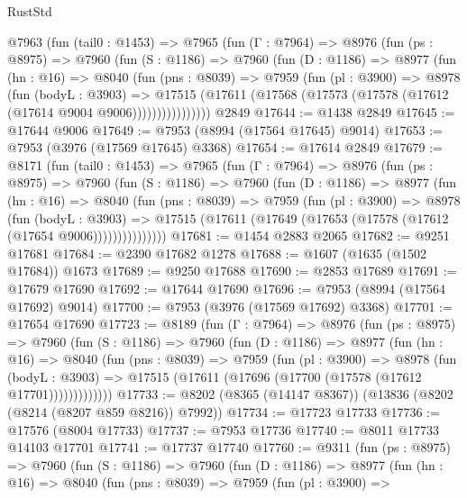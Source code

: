 \begin{lexlean}{RustStd}
\begin{coremodule}
    @7963
      (fun (tail0 : @1453) =>
      @7965
        (fun (Γ : @7964) =>
        @8976
          (fun (ps : @8975) =>
          @7960
            (fun (S : @1186) =>
            @7960
              (fun (D : @1186) =>
              @8977
                (fun (hn : @16) =>
                @8040
                  (fun (pns : @8039) =>
                  @7959
                    (fun (pl : @3900) =>
                    @8978
                      (fun (bodyL : @3903) =>
                      @17515
                        (@17611 (@17568 (@17573 (@17578 (@17612 (@17614 @9004 @9006))))))))))))))))
    @2849
@17644 := @1438 @2849
@17645 := @17644 @9006
@17649 := @7953 (@8994 (@17564 @17645) @9014)
@17653 := @7953 (@3976 (@17569 @17645) @3368)
@17654 := @17614 @2849
@17679 := @8171
    (fun (tail0 : @1453) =>
    @7965
      (fun (Γ : @7964) =>
      @8976
        (fun (ps : @8975) =>
        @7960
          (fun (S : @1186) =>
          @7960
            (fun (D : @1186) =>
            @8977
              (fun (hn : @16) =>
              @8040
                (fun (pns : @8039) =>
                @7959
                  (fun (pl : @3900) =>
                  @8978
                    (fun (bodyL : @3903) =>
                    @17515 (@17611 (@17649 (@17653 (@17578 (@17612 (@17654 @9006)))))))))))))))
@17681 := @1454 @2883 @2065
@17682 := @9251 @17681
@17684 := @2390 @17682 @1278
@17688 := @1607 (@1635 (@1502 @17684)) @1673
@17689 := @9250 @17688
@17690 := @2853 @17689
@17691 := @17679 @17690
@17692 := @17644 @17690
@17696 := @7953 (@8994 (@17564 @17692) @9014)
@17700 := @7953 (@3976 (@17569 @17692) @3368)
@17701 := @17654 @17690
@17723 := @8189
    (fun (Γ : @7964) =>
    @8976
      (fun (ps : @8975) =>
      @7960
        (fun (S : @1186) =>
        @7960
          (fun (D : @1186) =>
          @8977
            (fun (hn : @16) =>
            @8040
              (fun (pns : @8039) =>
              @7959
                (fun (pl : @3900) =>
                @8978
                  (fun (bodyL : @3903) =>
                  @17515 (@17611 (@17696 (@17700 (@17578 (@17612 @17701)))))))))))))
@17733 := @8202 (@8365 (@14147 @8367)) (@13836 (@8202 (@8214 (@8207 @859 @8216)) @7992))
@17734 := @17723 @17733
@17736 := @17576 (@8004 @17733)
@17737 := @7953 @17736
@17740 := @8011 @17733 @14103 @17701
@17741 := @17737 @17740
@17760 := @9311
    (fun (ps : @8975) =>
    @7960
      (fun (S : @1186) =>
      @7960
        (fun (D : @1186) =>
        @8977
          (fun (hn : @16) =>
          @8040
            (fun (pns : @8039) =>
            @7959
              (fun (pl : @3900) =>

\end{coremodule}
\end{lexlean}
